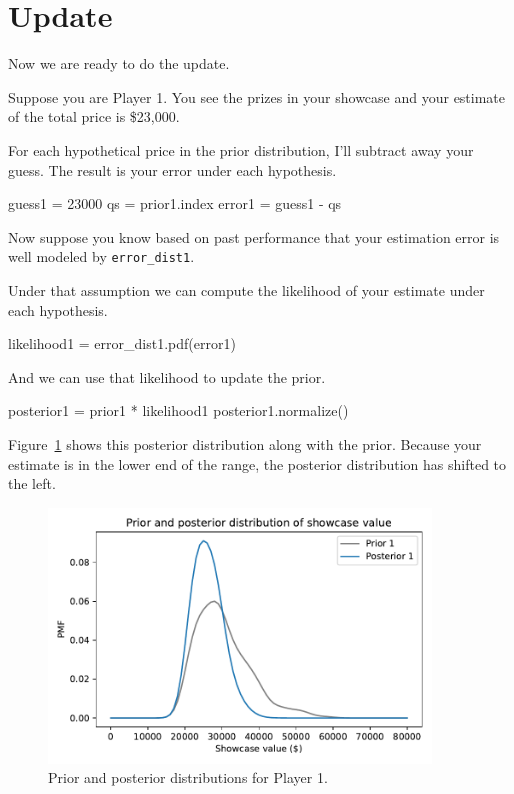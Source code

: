 \documentclass[12pt]{book}
\theoremstyle{exercise}
\newcommand{\py}[1]{{\tt #1}}%
\begin{document}
\section{Update}

Now we are ready to do the update.

Suppose you are Player 1.  You see the prizes in your showcase and your estimate of the total price is \$23,000.

For each hypothetical price in the prior distribution, I'll subtract away your guess.
The result is your error under each hypothesis.

\begin{code}
guess1 = 23000
qs = prior1.index
error1 = guess1 - qs
\end{code}

Now suppose you know based on past performance that your estimation error is well modeled by \py{error_dist1}.

Under that assumption we can compute the likelihood of your estimate under each hypothesis.

\begin{code}
likelihood1 = error_dist1.pdf(error1)
\end{code}

And we can use that likelihood to update the prior.

\begin{code}
posterior1 = prior1 * likelihood1
posterior1.normalize()
\end{code}

Figure~\ref{fig08-03} shows this posterior distribution along with the prior.
Because your estimate is in the lower end of the range, the posterior distribution has shifted to the left.

\begin{figure}
\centerline{\includegraphics[width=4in]{figs/fig08-03.pdf}}
\caption{Prior and posterior distributions for Player 1.}
\label{fig08-03}
\end{figure}
\end{document}
